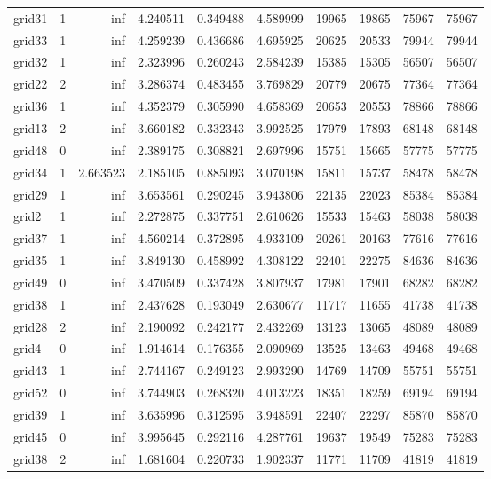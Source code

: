 \begin{longtable}{|l|r|r|r|r|r|r|r|r|r|}
grid31 & 1 & inf & 4.240511 & 0.349488 & 4.589999 & 19965 & 19865 & 75967 & 75967 \\
grid33 & 1 & inf & 4.259239 & 0.436686 & 4.695925 & 20625 & 20533 & 79944 & 79944 \\
grid32 & 1 & inf & 2.323996 & 0.260243 & 2.584239 & 15385 & 15305 & 56507 & 56507 \\
grid22 & 2 & inf & 3.286374 & 0.483455 & 3.769829 & 20779 & 20675 & 77364 & 77364 \\
grid36 & 1 & inf & 4.352379 & 0.305990 & 4.658369 & 20653 & 20553 & 78866 & 78866 \\
grid13 & 2 & inf & 3.660182 & 0.332343 & 3.992525 & 17979 & 17893 & 68148 & 68148 \\
grid48 & 0 & inf & 2.389175 & 0.308821 & 2.697996 & 15751 & 15665 & 57775 & 57775 \\
grid34 & 1 & 2.663523 & 2.185105 & 0.885093 & 3.070198 & 15811 & 15737 & 58478 & 58478 \\
grid29 & 1 & inf & 3.653561 & 0.290245 & 3.943806 & 22135 & 22023 & 85384 & 85384 \\
grid2 & 1 & inf & 2.272875 & 0.337751 & 2.610626 & 15533 & 15463 & 58038 & 58038 \\
grid37 & 1 & inf & 4.560214 & 0.372895 & 4.933109 & 20261 & 20163 & 77616 & 77616 \\
grid35 & 1 & inf & 3.849130 & 0.458992 & 4.308122 & 22401 & 22275 & 84636 & 84636 \\
grid49 & 0 & inf & 3.470509 & 0.337428 & 3.807937 & 17981 & 17901 & 68282 & 68282 \\
grid38 & 1 & inf & 2.437628 & 0.193049 & 2.630677 & 11717 & 11655 & 41738 & 41738 \\
grid28 & 2 & inf & 2.190092 & 0.242177 & 2.432269 & 13123 & 13065 & 48089 & 48089 \\
grid4 & 0 & inf & 1.914614 & 0.176355 & 2.090969 & 13525 & 13463 & 49468 & 49468 \\
grid43 & 1 & inf & 2.744167 & 0.249123 & 2.993290 & 14769 & 14709 & 55751 & 55751 \\
grid52 & 0 & inf & 3.744903 & 0.268320 & 4.013223 & 18351 & 18259 & 69194 & 69194 \\
grid39 & 1 & inf & 3.635996 & 0.312595 & 3.948591 & 22407 & 22297 & 85870 & 85870 \\
grid45 & 0 & inf & 3.995645 & 0.292116 & 4.287761 & 19637 & 19549 & 75283 & 75283 \\
grid38 & 2 & inf & 1.681604 & 0.220733 & 1.902337 & 11771 & 11709 & 41819 & 41819 \\

\end{longtable}
